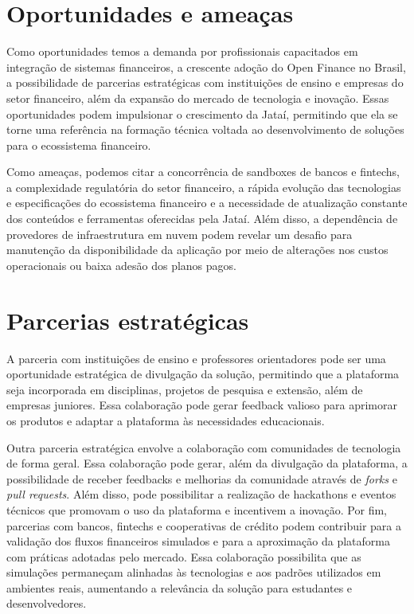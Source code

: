 \documentclass[
  12pt,
  openright,
  oneside,
  a4paper,
  brazilian
]{abntex2}
\begin{document}
\section{Oportunidades e ameaças}
Como oportunidades temos a demanda por profissionais capacitados em integração de sistemas financeiros, a crescente adoção do Open Finance no Brasil, a possibilidade de parcerias estratégicas com instituições de ensino e empresas do setor financeiro, além da expansão do mercado de tecnologia e inovação. Essas oportunidades podem impulsionar o crescimento da Jataí, permitindo que ela se torne uma referência na formação técnica voltada ao desenvolvimento de soluções para o ecossistema financeiro.

Como ameaças, podemos citar a concorrência de sandboxes de bancos e fintechs, a complexidade regulatória do setor financeiro, a rápida evolução das tecnologias e especificações do ecossistema financeiro e a necessidade de atualização constante dos conteúdos e ferramentas oferecidas pela Jataí. Além disso, a dependência de provedores de infraestrutura em nuvem podem revelar um desafio para manutenção da disponibilidade da aplicação por meio de alterações nos custos operacionais ou baixa adesão dos planos pagos.

\section{Parcerias estratégicas}
A parceria com instituições de ensino e professores orientadores pode ser uma oportunidade estratégica de divulgação da solução, permitindo que a plataforma seja incorporada em disciplinas, projetos de pesquisa e extensão, além de empresas juniores. Essa colaboração pode gerar feedback valioso para aprimorar os produtos e adaptar a plataforma às necessidades educacionais.

Outra parceria estratégica envolve a colaboração com comunidades de tecnologia de forma geral. Essa colaboração pode gerar, além da divulgação da plataforma, a possibilidade de receber feedbacks e melhorias da comunidade através de \textit{forks} e \textit{pull requests}. Além disso, pode possibilitar a realização de hackathons e eventos técnicos que promovam o uso da plataforma e incentivem a inovação.
Por fim, parcerias com bancos, fintechs e cooperativas de crédito podem contribuir para a validação dos fluxos financeiros simulados e para a aproximação da plataforma com práticas adotadas pelo mercado. Essa colaboração possibilita que as simulações permaneçam alinhadas às tecnologias e aos padrões utilizados em ambientes reais, aumentando a relevância da solução para estudantes e desenvolvedores.
\end{document}
